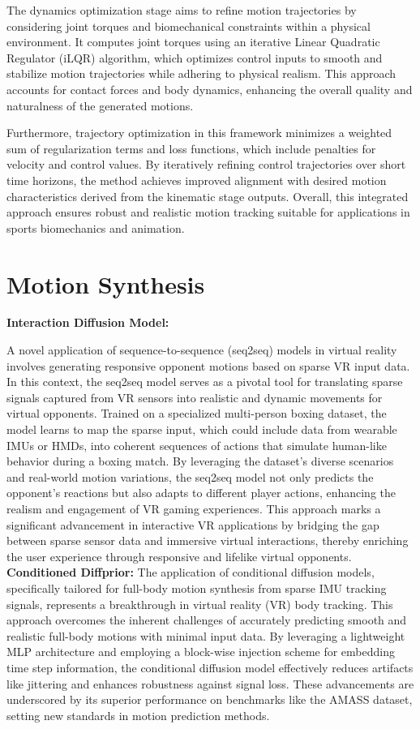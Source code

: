 The dynamics optimization stage aims to refine motion trajectories by considering joint torques and biomechanical constraints within a physical environment. It computes joint torques using an iterative Linear Quadratic Regulator (iLQR) algorithm, which optimizes control inputs to smooth and stabilize motion trajectories while adhering to physical realism. This approach accounts for contact forces and body dynamics, enhancing the overall quality and naturalness of the generated motions.

Furthermore, trajectory optimization in this framework minimizes a weighted sum of regularization terms and loss functions, which include penalties for velocity and control values. By iteratively refining control trajectories over short time horizons, the method achieves improved alignment with desired motion characteristics derived from the kinematic stage outputs. Overall, this integrated approach ensures robust and realistic motion tracking suitable for applications in sports biomechanics and animation.

\section{Motion Synthesis}
\textbf{Interaction Diffusion Model:}
 
A novel application of sequence-to-sequence (seq2seq) models in virtual reality involves generating responsive opponent motions based on sparse VR input data. In this context, the seq2seq model serves as a pivotal tool for translating sparse signals captured from VR sensors into realistic and dynamic movements for virtual opponents. Trained on a specialized multi-person boxing dataset, the model learns to map the sparse input, which could include data from wearable IMUs or HMDs, into coherent sequences of actions that simulate human-like behavior during a boxing match. By leveraging the dataset’s diverse scenarios and real-world motion variations, the seq2seq model not only predicts the opponent’s reactions but also adapts to different player actions, enhancing the realism and engagement of VR gaming experiences. This approach marks a significant advancement in interactive VR applications by bridging the gap between sparse sensor data and immersive virtual interactions, thereby enriching the user experience through responsive and lifelike virtual opponents.
\textbf{Conditioned Diffprior:}
The application of conditional diffusion models, specifically tailored for full-body motion synthesis from sparse IMU tracking signals, represents a breakthrough in virtual reality (VR) body tracking. This approach overcomes the inherent challenges of accurately predicting smooth and realistic full-body motions with minimal input data. By leveraging a lightweight MLP architecture and employing a block-wise injection scheme for embedding time step information, the conditional diffusion model effectively reduces artifacts like jittering and enhances robustness against signal loss. These advancements are underscored by its superior performance on benchmarks like the AMASS dataset, setting new standards in motion prediction methods.

